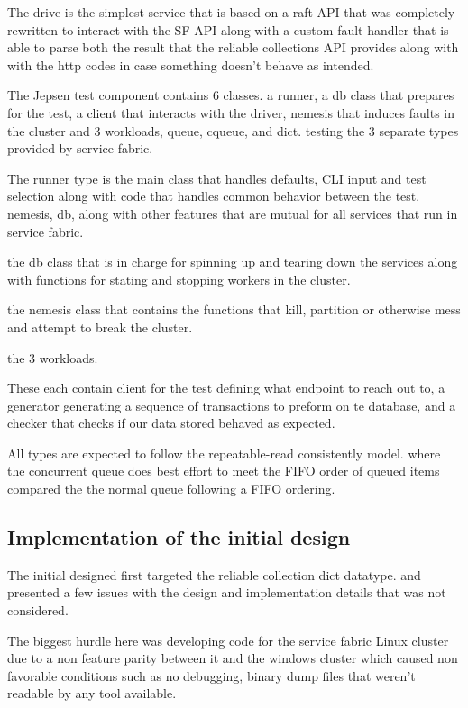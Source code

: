 \documentclass[a4paper,10pt,titlepage]{report}
\begin{document}
    The drive is the simplest service that is based on a raft API that was completely rewritten to interact with the SF API along with a custom fault handler that is able to parse both the result that the reliable collections API provides along with with the http codes in case something doesn't behave as intended.

    The Jepsen test component contains 6 classes. a runner, a db class that prepares for the test, a client that interacts with the driver, nemesis that induces faults in the cluster and 3 workloads, queue, cqueue, and dict. testing the 3 separate types provided by service fabric.

    The runner type is the main class that handles defaults, CLI input and test selection along with code that handles common behavior between the test. nemesis, db, along with other features that are mutual for all services that run in service fabric.

    the db class that is in charge for spinning up and tearing down the services along with functions for stating and stopping workers in the cluster.

    the nemesis class that contains the functions that kill, partition or otherwise mess and attempt to break the cluster.

    the 3 workloads.

    These each contain client for the test defining what endpoint to reach out to, a generator generating a sequence of transactions to preform on te database, and a checker that checks if our data stored behaved as expected.

    All types are expected to follow the repeatable-read consistently model. where the concurrent queue does best effort to meet the FIFO order of queued items compared the the normal queue following a FIFO ordering.

    \subsection{Implementation of the initial design}

    The initial designed first targeted the reliable collection dict datatype. and presented a few issues with the design and implementation details that was not considered.

    The biggest hurdle here was developing code for the service fabric Linux cluster due to a non feature parity between it and the windows cluster which caused non favorable conditions such as no debugging, binary dump files that weren't readable by any tool available.
\end{document}
